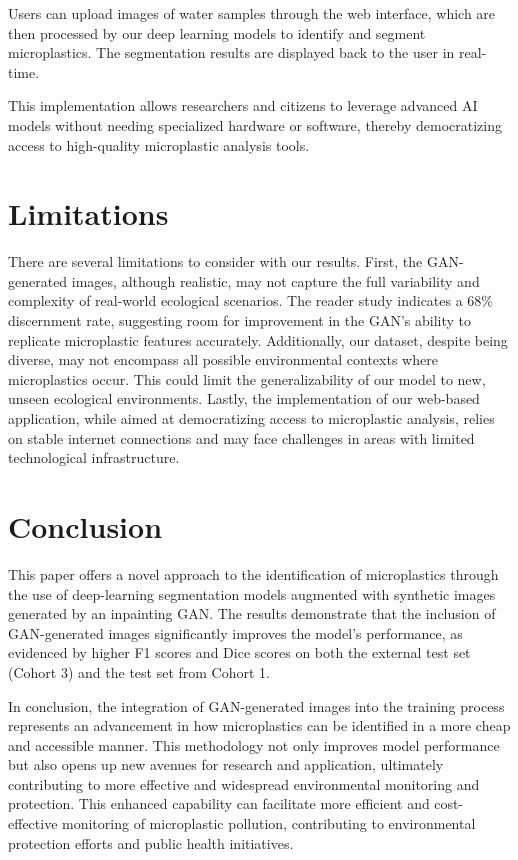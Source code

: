\documentclass{article}
\begin{document}
Users can upload images of water samples through the web interface, which are then processed by our deep learning models to identify and segment microplastics. The segmentation results are displayed back to the user in real-time.

This implementation allows researchers and citizens to leverage advanced AI models without needing specialized hardware or software, thereby democratizing access to high-quality microplastic analysis tools.

\section{Limitations}

There are several limitations to consider with our results. First, the GAN-generated images, although realistic, may not capture the full variability and complexity of real-world ecological scenarios. The reader study indicates a 68\% discernment rate, suggesting room for improvement in the GAN's ability to replicate microplastic features accurately. Additionally, our dataset, despite being diverse, may not encompass all possible environmental contexts where microplastics occur. This could limit the generalizability of our model to new, unseen ecological environments. Lastly, the implementation of our web-based application, while aimed at democratizing access to microplastic analysis, relies on stable internet connections and may face challenges in areas with limited technological infrastructure.

\section{Conclusion}

This paper offers a novel approach to the identification of microplastics through the use of deep-learning segmentation models augmented with synthetic images generated by an inpainting GAN. The results demonstrate that the inclusion of GAN-generated images significantly improves the model's performance, as evidenced by higher F1 scores and Dice scores on both the external test set (Cohort 3) and the test set from Cohort 1.

In conclusion, the integration of GAN-generated images into the training process represents an advancement in how microplastics can be identified in a more cheap and accessible manner. This methodology not only improves model performance but also opens up new avenues for research and application, ultimately contributing to more effective and widespread environmental monitoring and protection. This enhanced capability can facilitate more efficient and cost-effective monitoring of microplastic pollution, contributing to environmental protection efforts and public health initiatives.
\end{document}
